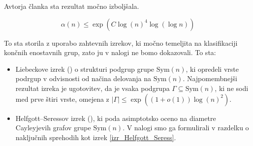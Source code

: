 Avtorja članka \cite{Kozma_Thom_2016} sta rezultat močno izboljšala.
\begin{izrek}\label{izr_kozma_thom_glavni}
    \begin{equation}\label{eq_kozma_thom}
        \alpha(n)  \le \exp(C \log(n)^4 \log (\log n))
    \end{equation}
\end{izrek}
To sta storila z uporabo zahtevnih izrekov, ki močno temeljita na klasifikaciji končnih enostavnih grup, zato ju v nalogi ne bomo dokazovali. To sta:
\begin{itemize}
    \item Liebeckove izrek (\cite{Liebeck_1984}) o strukturi podgrup grupe $\text{Sym}(n)$, ki opredeli vrste podrgup v odvisnosti od načina delovanja na $\text{Sym}(n)$. Najpomembnejši rezultat izreka je ugotovitev, da je vsaka podgrupa $\Gamma \subseteq  \text{Sym}(n)$, ki ne sodi med prve štiri vrste, omejena z $\lvert \Gamma \rvert \le \exp((1 + o(1)) \log(n)^2)$. 
    \item Helfgott--Seressov izrek (\cite{Helfgott_Seress_2013}), ki poda asimptotsko oceno na diametre Cayleyjevih grafov grupe $\text{Sym}(n)$. V nalogi smo ga formulirali v razdelku o naključnih sprehodih kot izrek \ref{izr_Helfgott_Seress}.
\end{itemize} 

